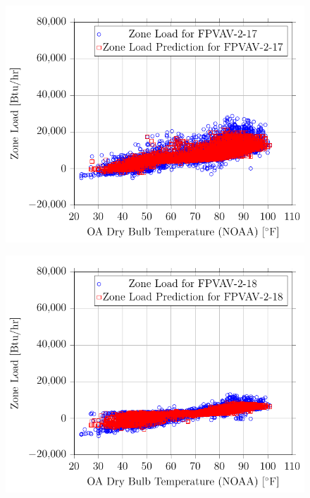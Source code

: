 \begin{figure}
    \centering
    \includegraphics{Plots/13/2017-06-27-1141-BtuhrvsOADryBulbTemperatureNOAAF.pdf}
    \caption{}
    \label{fig:2017-06-27-1141-BtuhrvsOADryBulbTemperatureNOAAF}
\end{figure}

\begin{figure}
\centering
\includegraphics{Plots/14/2017-06-27-1145-BtuhrvsOADryBulbTemperatureNOAAF.pdf}
\caption{}
\label{fig:2017-06-27-1145-BtuhrvsOADryBulbTemperatureNOAAF}
\end{figure}


